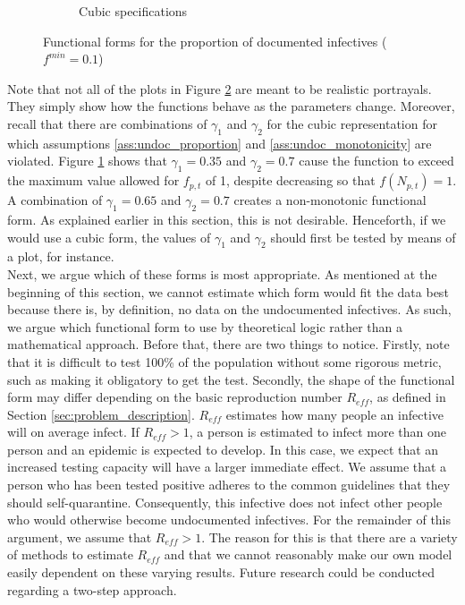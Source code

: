 \documentclass[12pt]{article}
\begin{document}
\begin{figure}[ht]
{\begin{subfigure}[pt]{0.48\linewidth}
	    \caption{Cubic specifications}
	    \label{fig:functional_forms_cubic}
	\end{subfigure}
    }
    
    \caption{Functional forms for the proportion of documented infectives ($f^{min} = 0.1$)}
    \label{fig:functional_forms}
    \end{figure}
    
    Note that not all of the plots in Figure \ref{fig:functional_forms} are meant to be realistic portrayals. They simply show how the functions behave as the parameters change. Moreover, recall that there are combinations of $\gamma_1$ and $\gamma_2$ for the cubic representation for which assumptions \ref{ass:undoc_proportion} and \ref{ass:undoc_monotonicity} are violated. Figure \ref{fig:functional_forms_cubic} shows that $\gamma_1=0.35$ and $\gamma_2=0.7$ cause the function to exceed the maximum value allowed for $f_{p,t}$ of 1, despite decreasing so that $f(N_{p,t}) = 1$. A combination of $\gamma_1=0.65$ and $\gamma_2=0.7$ creates a non-monotonic functional form. As explained earlier in this section, this is not desirable. Henceforth, if we would use a cubic form, the values of $\gamma_1$ and $\gamma_2$ should first be tested by means of a plot, for instance. \\
    
    Next, we argue which of these forms is most appropriate. As mentioned at the beginning of this section, we cannot estimate which form would fit the data best because there is, by definition, no data on the undocumented infectives. As such, we argue which functional form to use by theoretical logic rather than a mathematical approach. Before that, there are two things to notice. Firstly, note that it is difficult to test 100\% of the population without some rigorous metric, such as making it obligatory to get the test. Secondly, the shape of the functional form may differ depending on the basic reproduction number $R_{eff}$, as defined in Section \ref{sec:problem_description}. $R_{eff}$ estimates how many people an infective will on average infect. If $R_{eff} > 1$, a person is estimated to infect more than one person and an epidemic is expected to develop. In this case, we expect that an increased testing capacity will have a larger immediate effect. We assume that a person who has been tested positive adheres to the common guidelines that they should self-quarantine. Consequently, this infective does not infect other people who would otherwise become undocumented infectives. For the remainder of this argument, we assume that $R_{eff} > 1$. The reason for this is that there are a variety of methods to estimate $R_{eff}$ and that we cannot reasonably make our own model easily dependent on these varying results. Future research could be conducted regarding a two-step approach. \\
    
\end{document}
